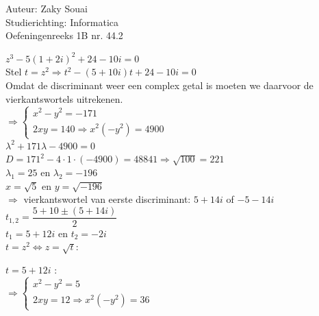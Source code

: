 \documentclass[a4paper]{article}
\begin{document}
  
\noindent \large Auteur: Zaky Souai \\
\noindent \large Studierichting:  Informatica\\
\noindent \large Oefeningenreeks 1B nr. 44.2\\

\bigskip

\normalsize

 $z^3 - 5(1 + 2i)^2 + 24 - 10i = 0$ \\

Stel $t = z^2 \Rightarrow t^2 - (5 + 10i)t + 24 - 10i = 0$ \\

Omdat de discriminant weer een complex getal is moeten we daarvoor de vierkantswortels uitrekenen. \\

$\Rightarrow \left\{
\begin{array}{l}
	x^2 - y^2 = -171 \\
	2xy = 140 \Rightarrow x^2(-y^2) = 4900
\end{array}
\right . $\\

$ \lambda^2 + 171\lambda -4900 = 0$\\

$D = 171^2 - 4 \cdot 1 \cdot (-4900) = 48841 \Rightarrow \sqrt{100} = 221$\\

$\lambda_{1} = 25$ en $\lambda_{2} = -196$\\

$x = \sqrt{5}$ en $y = \sqrt{-196} $\\

$\Rightarrow$ vierkantswortel van eerste discriminant: $5 + 14i$ of $-5 - 14i$ \\

$t_{1,2} = \dfrac{5+10 \pm (5 + 14i)}{2}$\\

$t_{1} = 5 + 12i$ en $t_{2} = -2i$\\

$ t = z^2 \Leftrightarrow z = \sqrt{t}:$\\

\newpage

$ t = 5+12i$ :\\

$\Rightarrow \left\{
\begin{array}{l}
	x^2 - y^2 = 5 \\
	2xy = 12 \Rightarrow x^2(-y^2) = 36
\end{array}
\right . $\\
\end{document}
